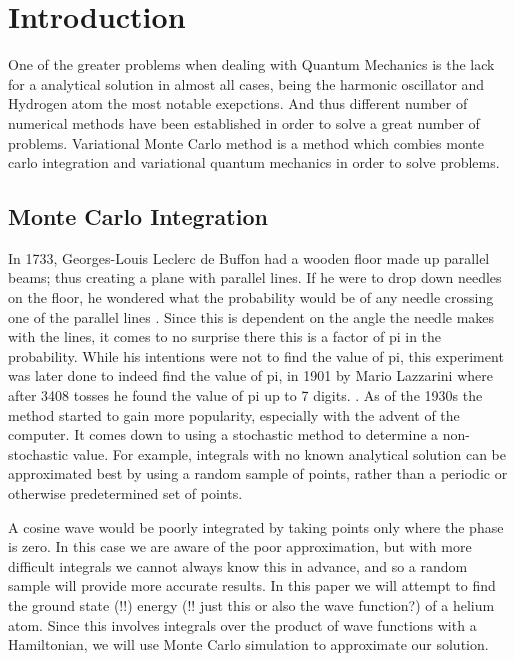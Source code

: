 

\section{Introduction}
One of the greater problems when dealing with Quantum Mechanics is the lack for a analytical solution
in almost all cases, being the harmonic oscillator and Hydrogen atom the most notable exepctions.
And thus different number of numerical methods have been established in order to solve a great number
of problems. Variational Monte Carlo method is a method which combies monte carlo integration and variational
quantum mechanics in order to solve problems.


\subsection{Monte Carlo Integration}
In 1733, Georges-Louis Leclerc
de Buffon had a wooden floor made up parallel beams; thus creating a plane with parallel lines.
If he were to drop down needles on the floor, he wondered what the probability would be of
any needle crossing one of the parallel lines \cite{Buffon}. Since this is dependent on the
angle the needle makes with the lines, it comes to no surprise there this is a factor of pi
in the probability. While his intentions were not to find the value of pi, this experiment
was later done to indeed find the value of pi, in 1901 by Mario Lazzarini where after 3408
tosses he found the value of pi up to 7 digits. \cite{Lazzarini}.
As of the 1930s the method started to gain more popularity, especially with the advent of the computer.
It comes down to using a stochastic method to determine a non-stochastic value. For example, integrals
with no known analytical solution can be approximated best by using a random sample of points, rather than
a periodic or otherwise predetermined set of points.

 A cosine wave would be poorly integrated by taking points
only where the phase is zero. In this case we are aware of the poor approximation, but with more difficult
integrals we cannot always know this in advance, and so a random sample will provide more accurate results.
In this paper we will attempt to find the ground state (!!) energy (!! just this or also the wave function?)
of a helium atom. Since this involves integrals over the product of wave functions with a Hamiltonian, we will
use Monte Carlo simulation to approximate our solution.

